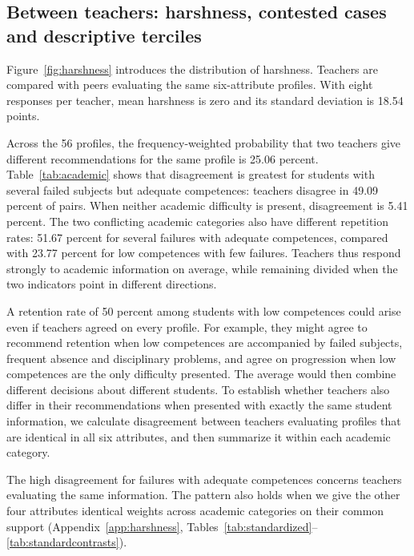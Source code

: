 \subsection{Between teachers: harshness, contested cases and descriptive terciles}
Figure~\ref{fig:harshness} introduces the distribution of harshness. Teachers are compared with peers evaluating the same six-attribute profiles. With eight responses per teacher, mean harshness is zero and its standard deviation is 18.54 points.

Across the 56 profiles, the frequency-weighted probability that two teachers give different recommendations for the same profile is 25.06 percent. Table~\ref{tab:academic} shows that disagreement is greatest for students with several failed subjects but adequate competences: teachers disagree in 49.09 percent of pairs. When neither academic difficulty is present, disagreement is 5.41 percent. The two conflicting academic categories also have different repetition rates: 51.67 percent for several failures with adequate competences, compared with 23.77 percent for low competences with few failures. Teachers thus respond strongly to academic information on average, while remaining divided when the two indicators point in different directions.


A retention rate of 50 percent among students with low competences could arise even if teachers agreed on every profile. For example, they might agree to recommend retention when low competences are accompanied by failed subjects, frequent absence and disciplinary problems, and agree on progression when low competences are the only difficulty presented. The average would then combine different decisions about different students. To establish whether teachers also differ in their recommendations when presented with exactly the same student information, we calculate disagreement between teachers evaluating profiles that are identical in all six attributes, and then summarize it within each academic category.

The high disagreement for failures with adequate competences concerns teachers evaluating the same information. The pattern also holds when we give the other four attributes identical weights across academic categories on their common support (Appendix~\ref{app:harshness}, Tables~\ref{tab:standardized}--\ref{tab:standardcontrasts}).

